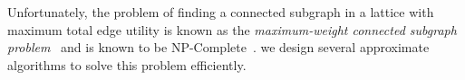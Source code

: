 {%
Unfortunately, the problem of finding a
connected subgraph in a lattice with
maximum total edge utility is known
as the \emph{maximum-weight connected subgraph problem}~\cite{ErnstAlthaus2009}
and is known to be {\sc NP-Complete}~\cite{Parameswaran2010}.
 we design several approximate algorithms to solve this problem efficiently.
}
